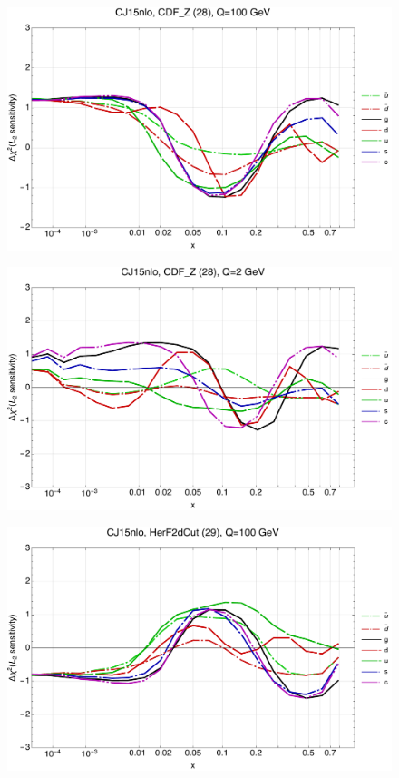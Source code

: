 \documentclass[10pt,aps,prd,floatfix,titlepage]{revtex4}
\begin{document}
\clearpage
\begin{figure}
\includegraphics[width=\textwidth,height=0.44\textheight,keepaspectratio]{1/28_CJ15nlo_L2_q100_Sf_1.pdf}
\caption{}
\end{figure}
\begin{figure}
\includegraphics[width=\textwidth,height=0.44\textheight,keepaspectratio]{1/28_CJ15nlo_L2_q2_Sf_1.pdf}
\caption{}
\end{figure}
\clearpage
\begin{figure}
\includegraphics[width=\textwidth,height=0.44\textheight,keepaspectratio]{1/29_CJ15nlo_L2_q100_Sf_1.pdf}
\caption{}
\end{figure}
\end{document}
